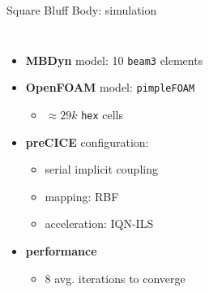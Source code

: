 \documentclass[10pt,t]{beamer}
\begin{document}
\begin{frame}{Square Bluff Body: simulation}
\begin{columns}
\footnotesize
\begin{itemize}
    \itemsep 10pt
    \item \textbf{MBDyn} model: 10 \texttt{beam3} elements
    \item \textbf{OpenFOAM} model: \texttt{pimpleFOAM}
    \begin{itemize}
        \item $\approx 29k$ \texttt{hex} cells
    \end{itemize}
    \item \textbf{preCICE} configuration:
    \begin{itemize}
        \item serial implicit coupling
        \item mapping: RBF
        \item acceleration: IQN-ILS
    \end{itemize}
    \item \textbf{performance}
    \begin{itemize}
        \item 8 avg. iterations to converge
    \end{itemize}

\end{itemize}

\end{columns}

\end{frame}
\end{document}
